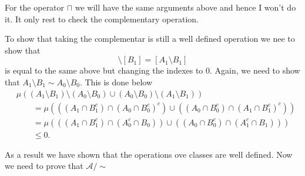 \documentclass[11pt,twoside,a4paper]{article}
\begin{document}
For the operator $\sqcap$ we will have the same arguments above and
hence I won't do it. It only rest to check the complementary operation.

To show that taking the complementar is still a well defined operation
we nee to show that
\begin{equation*}
    [A_1] \setminus [B_1] = [A_1 \setminus B_1]
\end{equation*}
is equal to the same above but changing the indexes to $0$.   
Again, we need to show that $A_1 \setminus B_1 \sim A_0 \setminus B_0$.
This is done below
\begin{align*}
    &\mu( (A_1 \setminus B_1) \setminus (A_0 \setminus B_0) 
      \cup
     (A_0 \setminus B_0) \setminus (A_1 \setminus B_1) ) \\
        & \qquad=
        \mu( ((A_1 \cap B_1^c) \cap (A_0 \cap B_0^c)^c)
          \cup
         ((A_0 \cap B_0^c) \cap (A_1 \cap B_1^c)^c) )\\
        & \qquad=
        \mu( ((A_1 \cap B_1^c) \cap (A_0^c \cap B_0))
          \cup
         ((A_0 \cap B_0^c) \cap (A_1^c \cap B_1)) )\\
        & \qquad \leq
         0.
\end{align*}

As a result we have shown that the operations ove classes are well defined.
Now we need to prove that $\mathcal{A}/\sim$  
\end{document}
